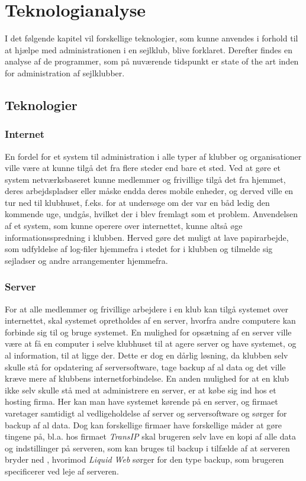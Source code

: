 \chapter{Teknologianalyse}\label{chap:teknologi-analyse}

I det følgende kapitel vil forskellige teknologier, som kunne anvendes i forhold til at hjælpe med
administrationen i en sejlklub, blive forklaret. Derefter findes en analyse af de programmer, som på nuværende
tidspunkt er state of the art inden for administration af sejlklubber.

\section{Teknologier}

\subsection{Internet}

En fordel for et system til administration i alle typer af klubber og organisationer ville være at kunne tilgå
det fra flere steder end bare et sted. Ved at gøre et system netværksbaseret kunne medlemmer og frivillige
tilgå det fra hjemmet, deres arbejdspladser eller måske endda deres mobile enheder, og derved ville en tur ned
til klubhuset, f.eks. for at undersøge om der var en båd ledig den kommende uge, undgås, hvilket der i
 blev fremlagt som et problem. Anvendelsen af et system, som kunne operere
over internettet, kunne altså øge informationsspredning i klubben. Herved gøre det muligt at lave papirarbejde, som
udfyldelse af log-filer hjemmefra i stedet for i klubben og tilmelde sig sejladser og andre arrangementer
hjemmefra.


\subsection{Server}

For at alle medlemmer og frivillige arbejdere i en klub kan tilgå systemet over internettet, skal systemet
opretholdes af en server, hvorfra andre computere kan forbinde sig til og bruge systemet. En mulighed for
opsætning af en server ville være at få en computer i selve klubhuset til at agere server og have systemet, og
al information, til at ligge der. Dette er dog en dårlig løsning, da klubben selv skulle stå for opdatering af
serversoftware, tage backup af al data og det ville kræve mere af klubbens internetforbindelse. En anden
mulighed for at en klub ikke selv skulle stå med at administrere en server, er at købe sig ind hos et hosting
firma. Her kan man have systemet kørende på en server, og firmaet varetager samtidigt al vedligeholdelse af
server og serversoftware og sørger for backup af al data. Dog kan forskellige firmaer have forskellige måder
at gøre tingene på, bl.a. hos firmaet \textit{TransIP} skal brugeren selv
lave en kopi af alle data og indstillinger på serveren, som kan bruges til backup i tilfælde af at serveren
bryder ned \citep{Virtuelserver}, hvorimod \textit{Liquid Web} \citep{liquid} sørger for den type backup, som
brugeren specificerer ved leje af serveren.

